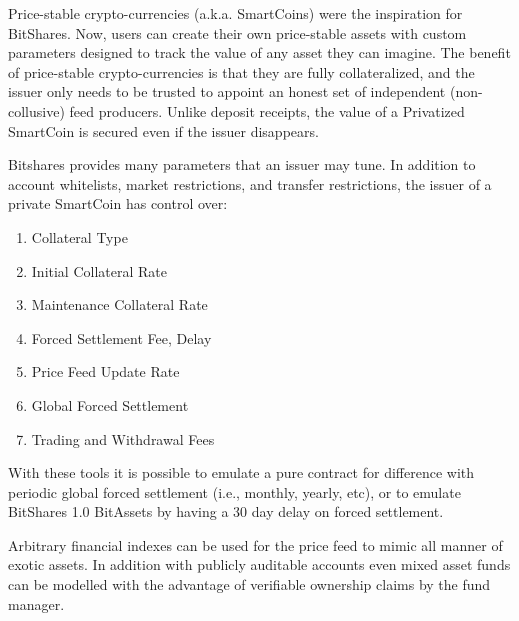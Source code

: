 Price-stable crypto-currencies (a.k.a. SmartCoins) were the inspiration for
BitShares. Now, users can create their own price-stable assets with custom
parameters designed to track the value of any asset they can imagine. The
benefit of price-stable crypto-currencies is that they are fully collateralized,
and the issuer only needs to be trusted to appoint an honest set of independent
(non-collusive) feed producers. Unlike deposit receipts, the value of a
Privatized SmartCoin is secured even if the issuer disappears.

Bitshares provides many parameters that an issuer may tune. In addition to
account whitelists, market restrictions, and transfer restrictions, the issuer
of a private SmartCoin has control over:

\begin{enumerate}
 \item Collateral Type
 \item Initial Collateral Rate
 \item Maintenance Collateral Rate
 \item Forced Settlement Fee, Delay %
 \item Price Feed Update Rate
 \item Global Forced Settlement
 \item Trading and Withdrawal Fees
\end{enumerate}

With these tools it is possible to emulate a pure contract for difference with
periodic global forced settlement (i.e., monthly, yearly, etc), or to emulate
BitShares 1.0 BitAssets by having a 30 day delay on forced settlement.

Arbitrary financial indexes can be used for the price feed to mimic all manner
of exotic assets. In addition with publicly auditable accounts even mixed asset
funds can be modelled with the advantage of verifiable ownership claims by the
fund manager.

